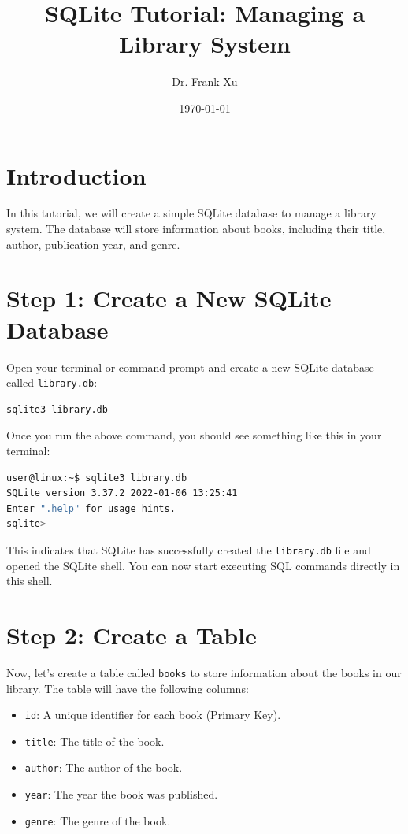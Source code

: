 \documentclass{article}
\title{SQLite Tutorial: Managing a Library System}
\author{Dr. Frank Xu}
\date{\today}
\begin{document}
\maketitle

\section*{Introduction}

In this tutorial, we will create a simple SQLite database to manage a library system. The database will store information about books, including their title, author, publication year, and genre.

\section*{Step 1: Create a New SQLite Database}

Open your terminal or command prompt and create a new SQLite database called \texttt{library.db}:

\begin{lstlisting}[language=bash]
sqlite3 library.db
\end{lstlisting}

Once you run the above command, you should see something like this in your terminal:

\begin{lstlisting}[language=bash]
user@linux:~$ sqlite3 library.db
SQLite version 3.37.2 2022-01-06 13:25:41
Enter ".help" for usage hints.
sqlite> 
\end{lstlisting}

This indicates that SQLite has successfully created the \texttt{library.db} file and opened the SQLite shell. You can now start executing SQL commands directly in this shell.

\section*{Step 2: Create a Table}

Now, let's create a table called \texttt{books} to store information about the books in our library. The table will have the following columns:

\begin{itemize}
    \item \texttt{id}: A unique identifier for each book (Primary Key).
    \item \texttt{title}: The title of the book.
    \item \texttt{author}: The author of the book.
    \item \texttt{year}: The year the book was published.
    \item \texttt{genre}: The genre of the book.
\end{itemize}
\end{document}
